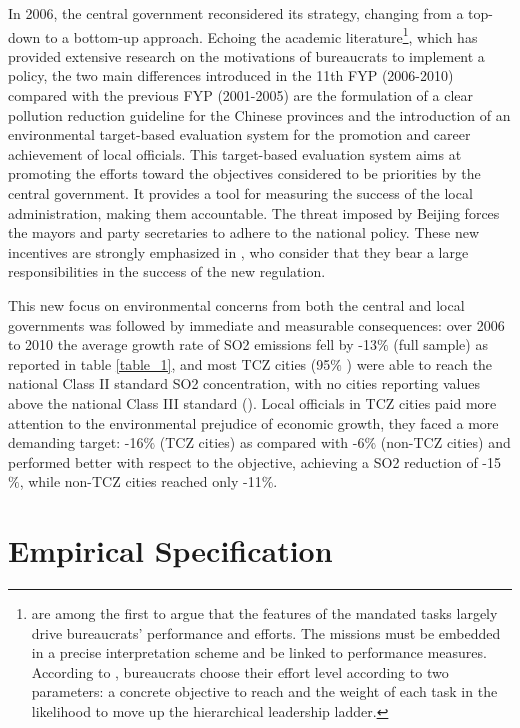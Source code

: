\documentclass[12pt]{article}
\begin{document}
In 2006, the central government reconsidered its strategy, changing from a top-down to a bottom-up approach. Echoing the academic literature\footnote{\cite{Dewatripont1999-nq,Alesina2007-xp} are among the first to argue that the features of the mandated tasks largely drive bureaucrats' performance and efforts. The missions must be embedded in a precise interpretation scheme and be linked to performance measures. According to \cite{Alesina2008-eq}, bureaucrats choose their effort level according to two parameters: a concrete objective to reach and the weight of each task in the likelihood to move up the hierarchical leadership ladder.}, which has provided extensive research on the motivations of bureaucrats to implement a policy, the two main differences introduced in the 11th FYP (2006-2010) compared with the previous FYP (2001-2005) are the formulation of a clear pollution reduction guideline for the Chinese provinces and the introduction of an environmental target-based evaluation system for the promotion and career achievement of local officials. This target-based evaluation system aims at promoting the efforts toward the objectives considered to be priorities by the central government. It provides a tool for measuring the success of the local administration, making them accountable. The threat imposed by Beijing forces the mayors and party secretaries to adhere to the national policy. These new incentives are strongly emphasized in \cite{Kahn2015-ok}, who consider that they bear a large responsibilities in the success of the new regulation.


This new focus on environmental concerns from both the central and local governments was followed by immediate and measurable consequences: over 2006 to 2010 the average growth rate of SO2 emissions fell by -13$\%$ (full sample) as reported in table \ref{table_1}, and most TCZ cities (95$\%$ ) were able to reach the national Class II standard SO2 concentration, with no cities reporting values above the national Class III standard (\cite{Ministry_of_Environmental_Protection_of_the_Peoples_Republic_of_China2011-oi}). Local officials in TCZ cities paid more attention to the environmental prejudice of economic growth, they faced a more demanding target: -16$\%$ (TCZ cities) as compared with -6$\%$ (non-TCZ cities) and performed better with respect to the objective, achieving a SO2 reduction of -15$\%$, while non-TCZ cities reached only -11$\%$. 


\section{Empirical Specification} \label{empirical}
\end{document}
